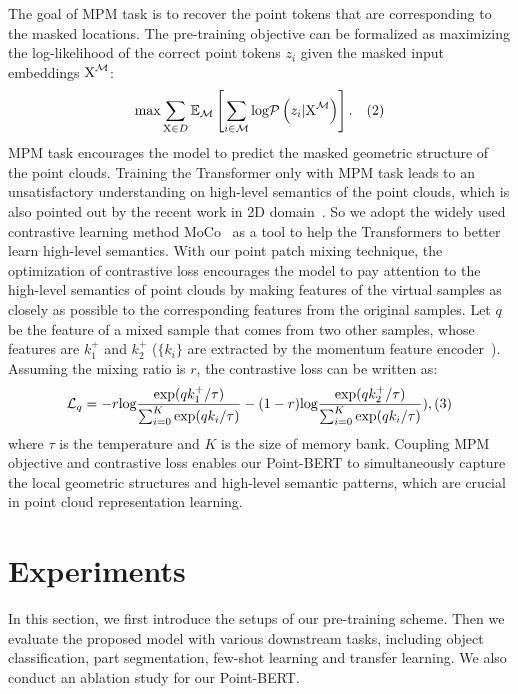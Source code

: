  The goal of MPM task is to recover the point tokens that are corresponding to the masked locations. The pre-training objective can be formalized as maximizing the log-likelihood of the correct point tokens $z_{i}$ given the masked input embeddings $\textup{X}^{\mathcal{M}}$:
\small\begin{equation}
	\textup{max}\sum_{\textup{X}\in D}^{}\mathbb{E}_{\mathcal{M}}\left [   \sum_{i\in \mathcal{M}  }^{} \textup{log} \mathcal{P}\left (  z_{i} | \textup{X}^{\mathcal{M}}\right ) \right ].  \quad    (2)
	\nonumber
\end{equation}\normalsize
MPM task encourages the model to predict the masked geometric structure of the point clouds.  Training the Transformer only with MPM task leads to an unsatisfactory understanding on high-level semantics of the point clouds, which is also pointed out by the recent work in 2D domain~\cite{ibot}. So we adopt the widely used contrastive learning method MoCo~\cite{moco} as a tool to help the Transformers to better learn high-level semantics. With our point patch mixing technique, the optimization of contrastive loss encourages the model to pay attention to the high-level semantics of point clouds by making features of the virtual samples as closely as possible to the corresponding features from the original samples. Let $q$ be the feature of a mixed sample that comes from two other samples, whose features are $k^{+}_1$ and $k^{+}_2$ ($\{k_i\}$ are extracted by the momentum feature encoder~\cite{moco}). Assuming the mixing ratio is $r$, the contrastive loss can be written as:
\small\begin{equation}
	\mathcal{L}_q = -r \textup{log} \frac{\textup{exp}(qk^{+}_1/ \tau)}{\sum_{i=0}^K \textup{exp}(qk_i/\tau)} - (1-r) \textup{log} \frac{\textup{exp}(qk^{+}_2/ \tau)}{\sum_{i=0}^K \textup{exp}(qk_i/\tau)}),    (3)
	\nonumber
\end{equation}\normalsize
where $\tau$ is the temperature and $K$ is the size of memory bank. Coupling MPM objective and contrastive loss enables our Point-BERT to simultaneously capture the local geometric structures and high-level semantic patterns, which are crucial in point cloud representation learning. 

	
\section{Experiments}
In this section, we first introduce the setups of our pre-training scheme. Then we evaluate the proposed model with various downstream tasks, including object classification, part segmentation, few-shot learning and transfer learning. We also conduct an ablation study for our Point-BERT. 

